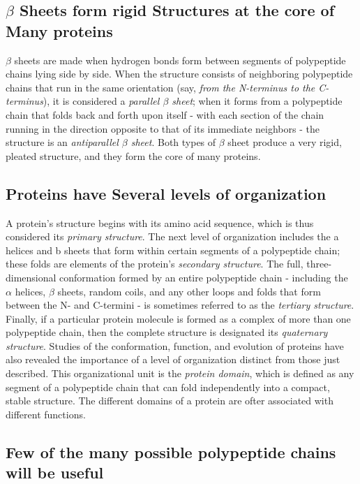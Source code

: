 \subsection{$\beta$ Sheets form rigid Structures at the core of Many proteins}

$\beta$ sheets are made when hydrogen bonds form between segments of polypeptide
chains lying side by side. When the structure consists of neighboring polypeptide chains that
run in the same orientation (say, \textit{from the N-terminus to the C-terminus}),
it is considered a \textit{parallel $\beta$ sheet}; when it forms from a polypeptide chain
that folds back and forth upon itself - with each section of the chain running
in the direction opposite to that of its immediate neighbors - the
structure is an \textit{antiparallel $\beta$ sheet}. Both types of $\beta$ sheet
produce a very rigid, pleated structure, and they form the core of many
proteins.

\subsection{Proteins have Several levels of organization}

A protein’s structure begins with its
amino acid sequence, which is thus considered its \textit{primary structure}. The
next level of organization includes the a helices and b sheets that form
within certain segments of a polypeptide chain; these folds are elements
of the protein’s \textit{secondary structure}. The full, three-dimensional conformation
formed by an entire polypeptide chain - including the $\alpha$ helices,
$\beta$ sheets, random coils, and any other loops and folds that form between
the N- and C-termini - is sometimes referred to as the \textit{tertiary structure}.
Finally, if a particular protein molecule is formed as a complex of more than one polypeptide
chain, then the complete structure is designated its \textit{quaternary structure}.
Studies of the conformation, function, and evolution of proteins have
also revealed the importance of a level of organization distinct from
those just described. This organizational unit is the \textit{protein domain},
which is defined as any segment of a polypeptide chain that can fold
independently into a compact, stable structure.
The different domains of a protein are ofter associated with different functions.

\subsection{Few of the many possible polypeptide chains will be useful}

